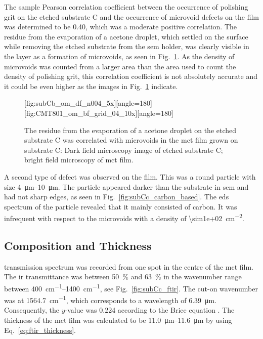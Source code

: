 The sample Pearson correlation coefficient between the occurrence of polishing grit on the etched substrate C and the occurrence of microvoid defects on the film was determined to be \SI{0.40}{}, which was a moderate positive correlation. The residue from the evaporation of a acetone droplet, which settled on the surface while removing the etched substrate from the \ac{sem} holder, was clearly visible in the layer as a formation of microvoids, as seen in Fig.~\ref{fig:subCc_microvoids_correlation}. As the density of microvoids was counted from a larger area than the area used to count the density of polishing grit, this correlation coefficient is not absolutely accurate and it could be even higher as the images in Fig.~\ref{fig:subCc_microvoids_correlation} indicate.

\begin{figure}[htbp]
    \centering
    [fig:subCb_om_df_n004_5x][angle=180]
    \hfill
    [fig:CMT801_om_bf_grid_04_10x][angle=180]
    \caption[Residue on etched substrate C visible as microvoids in the film.]{The residue from the evaporation of a acetone droplet on the etched substrate C was correlated with microvoids in the \ac{mct} film grown on substrate C:  Dark field microscopy image of etched substrate C;  bright field microscopy of \ac{mct} film.}\label{fig:subCc_microvoids_correlation}
\end{figure}

A second type of defect was observed on the film. This was a round particle with size \SIrange{4}{10}{\micro\metre}. The particle appeared darker than the substrate in \ac{sem} and had not sharp edges, as seen in Fig.~\ref{fig:subCc_carbon_based}. The \ac{eds} spectrum of the particle revealed that it mainly consisted of carbon. It was infrequent with respect to the microvoids with a density of \SI{\sim1e+02}{\centi\metre^{-2}}.

\subsection{Composition and Thickness}

 transmission spectrum was recorded from one spot in the centre of the \ac{mct} film. The \ac{ir} transmittance was between \SI{50}{\percent} and \SI{63}{\percent} in the wavenumber range between \SIrange{400}{1400}{\centi\metre^{-1}}, see Fig.~\ref{fig:subCc_ftir}. The cut-on wavenumber was at \SI{1564.7}{\centi\metre^{-1}}, which corresponds to a wavelength of \SI{6.39}{\micro\metre}. Consequently, the $y$-value was \SI{0.224}{} according to the Brice equation \citep{brice1975some}. The thickness of the \ac{mct} film was calculated to be \SIrange{11.0}{11.6}{\micro\metre} by using Eq.~\ref{eq:ftir_thickness}.

